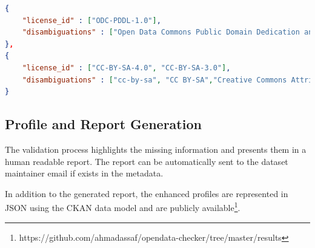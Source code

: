 \documentclass[runningheads,a4paper]{llncs}
\begin{document}
\begin{lstlisting}[language=json]
{
	"license_id" : ["ODC-PDDL-1.0"],
	"disambiguations" : ["Open Data Commons Public Domain Dedication and License (PDDL)"]
},
{
	"license_id" : ["CC-BY-SA-4.0", "CC-BY-SA-3.0"],
	"disambiguations" : ["cc-by-sa", "CC BY-SA","Creative Commons Attribution Share-Alike"]
}
\end{lstlisting}





\subsection{Profile and Report Generation}

The validation process highlights the missing information and presents them in a human readable report. The report can be automatically sent to the dataset maintainer email if exists in the metadata.

In addition to the generated report, the enhanced profiles are represented in JSON using the CKAN data model and are publicly available\footnote{https://github.com/ahmadassaf/opendata-checker/tree/master/results}.
\end{document}

